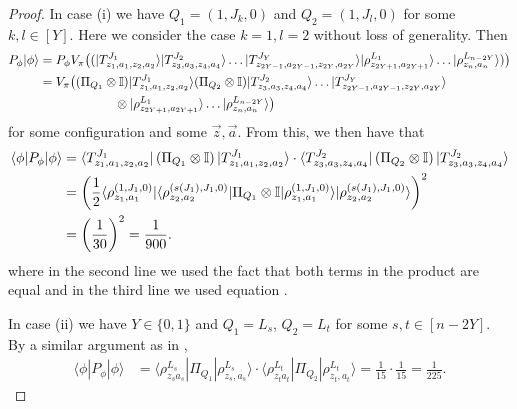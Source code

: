 \documentclass[../thesis-main/thesis-main]{subfiles}
\begin{document}
\begin{proof}
In case (i) we have $Q_{1}=(1,J_{k},0)$ and $Q_{2}=(1,J_{l},0)$ for some $k,l \in [Y]$.  Here we consider the case $k=1,l=2$ without loss of generality. Then
\begin{align}
P_{\phi}|\phi\rangle 
  & =P_\phi V_\pi \big((|T_{z_{1},a_{1},z_{2},a_{2}}^{J_{1}}\rangle|T_{z_{3},a_{3},z_{4},a_{4}}^{J_{2}}\rangle\ldots|T_{z_{2Y-1},a_{2Y-1},z_{2Y},a_{2Y}}^{J_{Y}}\rangle|\rho_{z_{2Y+1},a_{2Y+1}}^{L_{1}}\rangle\ldots|\rho_{z_{n},a_{n}}^{L_{n-2Y}}\rangle)\big) \\
   & =V_\pi\big((\Pi_{Q_{1}}\otimes\mathbb{I})|T_{z_{1},a_{1},z_{2},a_{2}}^{J_{1}}\rangle(\Pi_{Q_{2}}\otimes\mathbb{I})|T_{z_{3},a_{3},z_{4},a_{4}}^{J_{2}}\rangle\ldots|T_{z_{2Y-1},a_{2Y-1},z_{2Y},a_{2Y}}^{J_{Y}}\rangle\nonumber\\
   &\qquad\qquad \qquad \otimes|\rho_{z_{2Y+1},a_{2Y+1}}^{L_{1}}\rangle\ldots|\rho_{z_{n},a_{n}}^{L_{n-2Y}}\rangle\big)\label{eq:P_phi_phi}
\end{align}
for some configuration and some $\vec z,\vec a$.  From this, we then have that  
\begin{align}
\langle\phi|P_{\phi}|\phi\rangle & =\langle T_{z_{1},a_{1},z_{2},a_{2}}^{J_{1}}|\left(\Pi_{Q_{1}}\otimes\mathbb{I}\right)|T_{z_{1},a_{1},z_{2},a_{2}}^{J_{1}}\rangle\cdot\langle T_{z_{3},a_{3},z_{4},a_{4}}^{J_{2}}|\left(\Pi_{Q_{2}}\otimes\mathbb{I}\right)|T_{z_{3},a_{3},z_{4},a_{4}}^{J_{2}}\rangle \\
 & =\left(\frac{1}{2}\langle\rho_{z_{1},a_{1}}^{(1,J_{1},0)}|\langle\rho_{z_{2},a_{2}}^{(s(J_{1}),J_{1},0)}|\Pi_{Q_{1}}\otimes\mathbb{I}|\rho_{z_{1},a_{1}}^{(1,J_{1},0)}\rangle|\rho_{z_{2},a_{2}}^{(s(J_{1}),J_{1},0)}\rangle\right)^{2}\\
 & =\left(\frac{1}{30}\right)^{2}=\frac{1}{900}.\label{eq:lowerboundcase_a}
\end{align}
where in the second line we used the fact that both terms in the product are equal and in the third line we used equation . 

In case (ii) we have $Y\in\{0,1\}$ and $Q_{1}=L_{s}$, $Q_{2}=L_{t}$ for some $s,t\in[n-2Y]$. By a similar argument as in ,
\begin{align}
\langle\phi|P_{\phi}|\phi\rangle & =\langle\rho_{z_{s}a_{s}}^{L_{s}}|\Pi_{Q_{1}}|\rho_{z_{s},a_{s}}^{L_{s}}\rangle\cdot\langle\rho_{z_{t}a_{t}}^{L_{t}}|\Pi_{Q_{2}}|\rho_{z_{t},a_{t}}^{L_{t}}\rangle
=\frac{1}{15}\cdot\frac{1}{15}
=\frac{1}{225}.\label{eq:lowerboundcase_b}
\end{align}


\end{proof}
\end{document}
